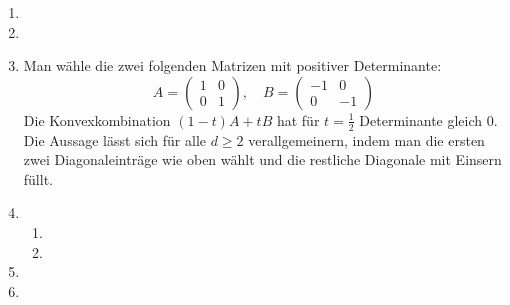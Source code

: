 \documentclass[a4paper,11pt]{scrartcl}
\begin{document}
\begin{enumerate}[label*=\textbf{10.\arabic*.}]

\item

\item

\item
  Man wähle die zwei folgenden Matrizen mit positiver Determinante:
  \[
    A = \begin{pmatrix} 1 & 0 \\ 0 & 1\end{pmatrix}, \quad
    B = \begin{pmatrix} -1 & 0 \\ 0 & -1\end{pmatrix}
  \]
  Die Konvexkombination $(1 - t) A + t B$ hat für $t = \frac{1}{2}$ Determinante
  gleich 0.
  Die Aussage lässt sich für alle $d \geq 2$ verallgemeinern, indem man die
  ersten zwei Diagonaleinträge wie oben wählt und die restliche Diagonale mit Einsern füllt.

\item
  \begin{enumerate}
  \item
  \item
  \end{enumerate}

\item

\item

\end{enumerate}
\end{document}
